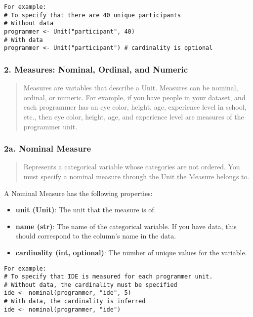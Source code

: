 \begin{verbatim}
For example:
# To specify that there are 40 unique participants
# Without data
programmer <- Unit("participant", 40)
# With data
programmer <- Unit("participant") # cardinality is optional
\end{verbatim}

\hypertarget{measures-nominal-ordinal-and-numeric}{%
\subsubsection{2. Measures: Nominal, Ordinal, and
Numeric}\label{measures-nominal-ordinal-and-numeric}}

\begin{quote}
Measures are variables that describe a Unit. Measures can be nominal,
ordinal, or numeric. For example, if you have people in your dataset,
and each programmer has an eye color, height, age, experience level in
school, etc., then eye color, height, age, and experience level are
measures of the programmer unit.
\end{quote}

\subsubsection{2a. Nominal Measure}

\begin{quote}
Represents a categorical variable whose categories are not ordered. You
must specify a nominal measure through the Unit the Measure belongs to.
\end{quote}

A Nominal Measure has the following properties:
\begin{itemize}
    \item \textbf{unit (Unit)}: The unit that the measure is of.
    \item \textbf{name (str)}: The name of the categorical variable. If you have data, this should correspond to the column’s name in the data.
    \item \textbf{cardinality (int, optional)}: The number of unique values for the variable.
\end{itemize}

\begin{verbatim}
For example:
# To specify that IDE is measured for each programmer unit.
# Without data, the cardinality must be specified
ide <- nominal(programmer, "ide", 5)
# With data, the cardinality is inferred
ide <- nominal(programmer, "ide")
\end{verbatim}

